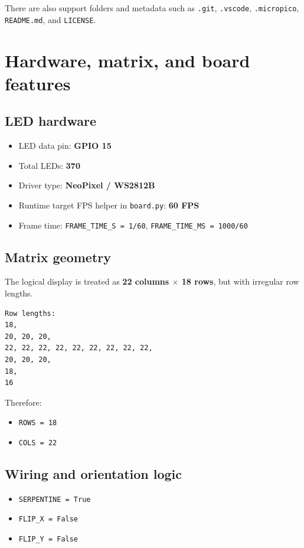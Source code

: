 \documentclass[11pt]{article}
\begin{document}
There are also support folders and metadata such as \texttt{.git}, \texttt{.vscode}, \texttt{.micropico}, \texttt{README.md}, and \texttt{LICENSE}.

\section{Hardware, matrix, and board features}
\subsection{LED hardware}
\begin{itemize}
  \item LED data pin: \textbf{GPIO 15}
  \item Total LEDs: \textbf{370}
  \item Driver type: \textbf{NeoPixel / WS2812B}
  \item Runtime target FPS helper in \texttt{board.py}: \textbf{60 FPS}
  \item Frame time: \texttt{FRAME\_TIME\_S = 1/60}, \texttt{FRAME\_TIME\_MS = 1000/60}
\end{itemize}

\subsection{Matrix geometry}
The logical display is treated as \textbf{22 columns $\times$ 18 rows}, but with irregular row lengths.

\begin{lstlisting}
Row lengths:
18,
20, 20, 20,
22, 22, 22, 22, 22, 22, 22, 22, 22,
20, 20, 20,
18,
16
\end{lstlisting}

Therefore:
\begin{itemize}
  \item \texttt{ROWS = 18}
  \item \texttt{COLS = 22}
\end{itemize}

\subsection{Wiring and orientation logic}
\begin{itemize}
  \item \texttt{SERPENTINE = True}
  \item \texttt{FLIP\_X = False}
  \item \texttt{FLIP\_Y = False}
\end{itemize}
\end{document}
